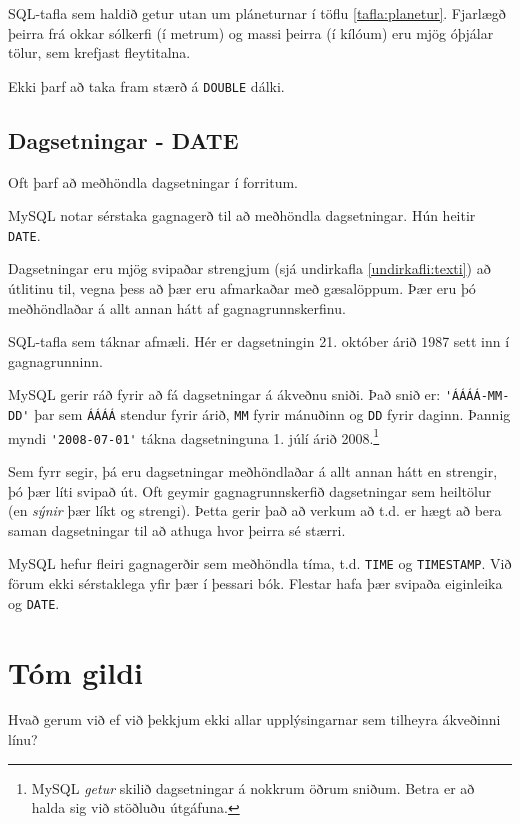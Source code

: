 \begin{example}
\caption[Plánetur]{SQL-tafla sem haldið getur utan um pláneturnar í töflu \ref{tafla:planetur}. Fjarlægð þeirra frá okkar sólkerfi (í metrum) og massi þeirra (í kílóum) eru mjög óþjálar tölur, sem krefjast fleytitalna.}
\label{sql:k3d7-planetur}
\centering
{}
\end{example}

Ekki þarf að taka fram stærð á \verb|DOUBLE| dálki.

\subsection{Dagsetningar - DATE}
Oft þarf að meðhöndla dagsetningar í forritum.

MySQL notar sérstaka gagnagerð til að meðhöndla dagsetningar. Hún heitir \verb|DATE|.

Dagsetningar eru mjög svipaðar strengjum (sjá undirkafla \ref{undirkafli:texti}) að útlitinu til, vegna þess að þær eru afmarkaðar með gæsalöppum. Þær eru þó meðhöndlaðar á allt annan hátt af gagnagrunnskerfinu.

\begin{example}
\caption[Afmælisdagar]{SQL-tafla sem táknar afmæli. Hér er dagsetningin 21. október árið 1987 sett inn í gagnagrunninn.}
\label{sql:k3d14-afmaeli}
\centering
{}
\end{example}

MySQL gerir ráð fyrir að fá dagsetningar á ákveðnu sniði. Það snið er: \verb|'ÁÁÁÁ-MM-DD'| þar sem \verb|ÁÁÁÁ| stendur fyrir árið, \verb|MM| fyrir mánuðinn og \verb|DD| fyrir daginn. Þannig myndi \verb|'2008-07-01'| tákna dagsetninguna 1. júlí árið 2008.\footnote{MySQL \emph{getur} skilið dagsetningar á nokkrum öðrum sniðum. Betra er að halda sig við stöðluðu útgáfuna.}

Sem fyrr segir, þá eru dagsetningar meðhöndlaðar á allt annan hátt en strengir, þó þær líti svipað út. Oft geymir gagnagrunnskerfið dagsetningar sem heiltölur (en \emph{sýnir} þær líkt og strengi). Þetta gerir það að verkum að t.d. er hægt að bera saman dagsetningar til að athuga hvor þeirra sé stærri.

MySQL hefur fleiri gagnagerðir sem meðhöndla tíma, t.d. \verb|TIME| og \verb|TIMESTAMP|. Við förum ekki sérstaklega yfir þær í þessari bók. Flestar hafa þær svipaða eiginleika og \verb|DATE|.

\section{Tóm gildi} %
Hvað gerum við ef við þekkjum ekki allar upplýsingarnar sem tilheyra ákveðinni línu?

